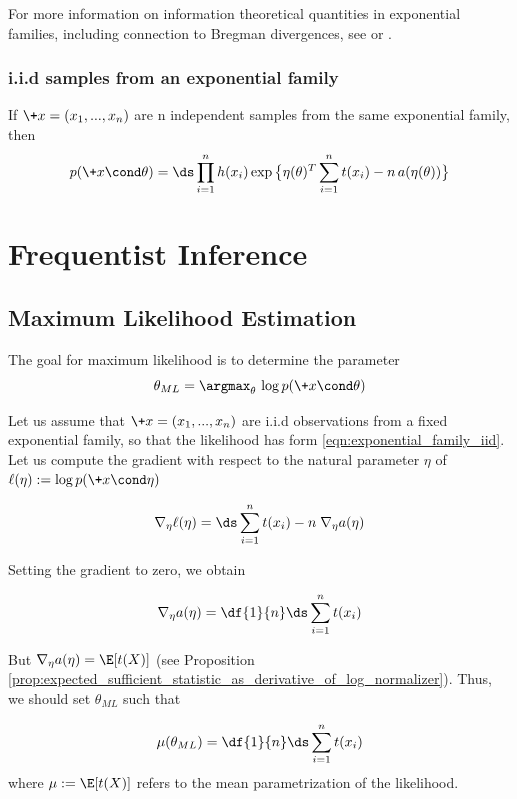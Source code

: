 \documentclass{article} %
\begin{document}
For more information on information theoretical quantities in exponential families, including connection to Bregman divergences,  see \cite{nielsen2010entropies} or \cite{nielsen2009statistical}.


\subsubsection{i.i.d samples from an exponential family} \label{sec:iid_samples_from_an_exponential_family}
If $\+x=(x_1, ..., x_n)$ are n independent samples from the same exponential family, then 
\begin{align}
\label{eqn:exponential_family_iid}
 p(\+x \cond \theta) = \ds\prod_{i=1}^n h(x_i) \exp \big\{ \eta(\theta)^T \sum_{i=1}^n t(x_i) - n \,a(\eta(\theta))\big\} 
 \end{align}


\section{Frequentist Inference}
\subsection{Maximum Likelihood Estimation} \label{sec:ml_with_ef}

The goal for maximum likelihood is to determine the parameter
\begin{equation}
\label{eqn:ml}
\theta_{ML} = \argmax_\theta  \, \log p(\+x \cond \theta) 
\end{equation}

Let us assume that $\+x=(x_1, ..., x_n)$ are i.i.d observations  from a fixed exponential family, so that the likelihood has form \eqref{eqn:exponential_family_iid}.  Let us compute the gradient with respect to the natural parameter $\eta$ of $\ell(\eta) := \log p(\+x \cond \eta)$

\[ \nabla_\eta \ell(\eta) = \ds\sum_{i=1}^n t(x_i) - n \; \nabla_\eta a(\eta) \]

Setting the gradient to zero, we obtain

\[ \nabla_\eta a(\eta) = \df{1}{n}  \ds\sum_{i=1}^n t(x_i) \]

But $\nabla_\eta a(\eta) = \E [t(X)]$  (see Proposition \ref{prop:expected_sufficient_statistic_as_derivative_of_log_normalizer}).  Thus, we should set $\theta_{ML}$ such that

\[ \mu(\theta_{ML}) = \df{1}{n} \ds\sum_{i=1}^n t(x_i) \]
where $\mu := \E[t(X)]$ refers to the mean parametrization of the likelihood. 
\end{document}
